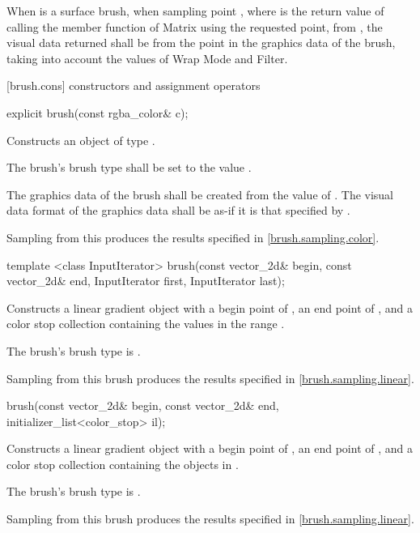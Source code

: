 \pnum
When  is a surface brush, when sampling point , where  is the return value of calling the  member function of Matrix using the requested point, from , the visual data returned shall be from the point  in the graphics data of the brush, taking into account the values of Wrap Mode and Filter.

 [brush.cons] { constructors and assignment operators}

\begin{itemdecl}
explicit brush(const rgba_color& c);
\end{itemdecl}
\begin{itemdescr}
\pnum
\effects
Constructs an object of type .

\pnum
The brush's brush type shall be set to the value .

\pnum
The graphics data of the brush shall be created from the value of . The visual data format of the graphics data shall be as-if it is that specified by .

\pnum
\remarks
Sampling from this produces the results specified in \ref{brush.sampling.color}.
\end{itemdescr}

\begin{itemdecl}
template <class InputIterator>
brush(const vector_2d& begin, const vector_2d& end,
  InputIterator first, InputIterator last);
\end{itemdecl}
\begin{itemdescr}
\pnum
\effects
Constructs a linear gradient  object with a begin point of , an end point of , and a color stop collection containing the values in the range .

\pnum
The brush's brush type is .

\pnum
\remarks
Sampling from this brush produces the results specified in \ref{brush.sampling.linear}.
\end{itemdescr}

\begin{itemdecl}
brush(const vector_2d& begin, const vector_2d& end,
  initializer_list<color_stop> il);
\end{itemdecl}
\begin{itemdescr}
\pnum
\effects
Constructs a linear gradient  object with a begin point of , an end point of , and a color stop collection containing the  objects in .

\pnum
The brush's brush type is .

\pnum
\remarks
Sampling from this brush produces the results specified in \ref{brush.sampling.linear}.
\end{itemdescr}

